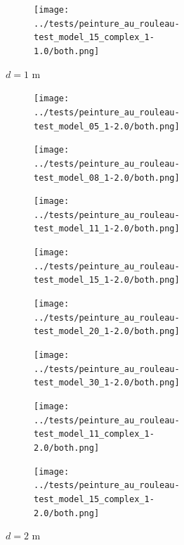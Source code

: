 \begin{theappendices}
\begin{figure}[H]
\begin{subfigure}[t]{\linewidth}
\begin{subfigure}[t]{0.11\linewidth}
				\end{subfigure}
				\hfill
				\begin{subfigure}[t]{0.11\linewidth}
					\texttt{[image: ../tests/peinture\_au\_rouleau-test\_model\_15\_complex\_1-1.0/both.png]}
				\end{subfigure}
				\caption{$d = 1$ m}
			\end{subfigure}
			\hfill
			\begin{subfigure}[t]{\linewidth}
				\centering
				\begin{subfigure}[t]{0.11\linewidth}
					\texttt{[image: ../tests/peinture\_au\_rouleau-test\_model\_05\_1-2.0/both.png]}
				\end{subfigure}
				\hfill
				\begin{subfigure}[t]{0.11\linewidth}
					\texttt{[image: ../tests/peinture\_au\_rouleau-test\_model\_08\_1-2.0/both.png]}
				\end{subfigure}
				\hfill
				\begin{subfigure}[t]{0.11\linewidth}
					\texttt{[image: ../tests/peinture\_au\_rouleau-test\_model\_11\_1-2.0/both.png]}
				\end{subfigure}
				\hfill
				\begin{subfigure}[t]{0.11\linewidth}
					\texttt{[image: ../tests/peinture\_au\_rouleau-test\_model\_15\_1-2.0/both.png]}
				\end{subfigure}
				\hfill
				\begin{subfigure}[t]{0.1\linewidth}
					\texttt{[image: ../tests/peinture\_au\_rouleau-test\_model\_20\_1-2.0/both.png]}
				\end{subfigure}
				\hfill
				\begin{subfigure}[t]{0.11\linewidth}
					\texttt{[image: ../tests/peinture\_au\_rouleau-test\_model\_30\_1-2.0/both.png]}
				\end{subfigure}
				\hfill
				\begin{subfigure}[t]{0.11\linewidth}
					\texttt{[image: ../tests/peinture\_au\_rouleau-test\_model\_11\_complex\_1-2.0/both.png]}
				\end{subfigure}
				\hfill
				\begin{subfigure}[t]{0.11\linewidth}
					\texttt{[image: ../tests/peinture\_au\_rouleau-test\_model\_15\_complex\_1-2.0/both.png]}
				\end{subfigure}
				\caption{$d = 2$ m}
			\end{subfigure}
			\hfill
			\begin{subfigure}[t]{\linewidth}
				\centering
				\begin{subfigure}[t]{0.11\linewidth}

\end{subfigure}
\end{subfigure}
\end{figure}
\end{theappendices}
